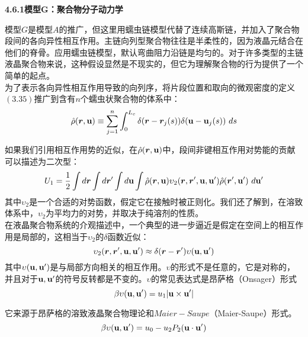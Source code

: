 \textbf{4.6.1模型G：聚合物分子动力学}

模型$G$是模型$A$的推广，但这里用蠕虫链模型代替了连续高斯链，并加入了聚合物段间的各向异性相互作用。主链向列型聚合物往往是半柔性的，因为液晶元结合在他们的脊骨。应用蠕虫链模型，默认弯曲阻力沿链是均匀的。对于许多类型的主链液晶聚合物来说，这种假设显然是不现实的，但它为理解聚合物的行为提供了一个简单的起点。\\

为了表示各向异性相互作用导致的向列序，将片段位置和取向的微观密度的定义$(3.35)$推广到含有$n$个蠕虫状聚合物的体系中：\\
\begin{equation}
\hat{\rho}(\bm{r},\mathbf{u}) \equiv \sum_{j=1}^{n} \int _{0}^{L_{c}} \delta(\bm{r}-\bm{r}_{j}(s)) \delta (\mathbf{u}-\mathbf{u}_{j}(s))~ds
\end{equation}

如果我们引用相互作用势的近似，在$\hat{\rho}(\bm{r},\mathbf{u})$中，段间非键相互作用对势能的贡献可以描述为二次型：\\
\begin{equation}
U_1=\frac{1}{2} \int d\bm{r} \int d\bm{r}' \int d\mathbf{u} \int  \hat{\rho}(\bm{r},\mathbf{u}) \upsilon_2(\bm{r},\bm{r}',\mathbf{u},\mathbf{u}') \hat{\rho}(\bm{r}',\mathbf{u}')~d\mathbf{u}'
\end{equation}
其中$\upsilon_2$是一个合适的对势函数，假定它在接触时被正则化。我们还了解到，在溶致体系中，$\upsilon_2$为平均力的对势，并取决于纯溶剂的性质。\\

在液晶聚合物系统的介观描述中，一个典型的进一步逼近是假定在空间上的相互作用是局部的，这相当于$\upsilon_2$的$\delta$函数近似：\\
\begin{equation}
\upsilon_{2}(\bm{r},\bm{r}',\mathbf{u},\mathbf{u}') \approx \delta(\bm{r}-\bm{r}') \upsilon(\mathbf{u},\mathbf{u}')
\end{equation}
其中$\upsilon(\mathbf{u},\mathbf{u}')$是与局部方向相关的相互作用。$\upsilon$的形式不是任意的，它是对称的，并且对于$\mathbf{u},\mathbf{u}'$的符号反转都是不变的。$\upsilon$的常见表达式是昂萨格（Onsager）形式\\
\begin{equation}
\beta \upsilon(\mathbf{u},\mathbf{u}')= u_{1}|\mathbf{u}\times \mathbf{u}'|
\end{equation}

它来源于昂萨格的溶致液晶聚合物理论和$Maier-Saupe$（Maier-Saupe）形式。\\
\begin{equation}
\beta \upsilon(\mathbf{u},\mathbf{u}')=u_0 - u_{2} P_{2}(\mathbf{u} \cdot \mathbf{u}')
\end{equation}


